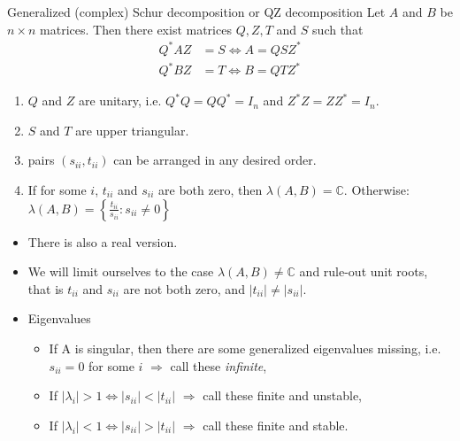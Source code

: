 \documentclass[10pt]{beamer}  %
\begin{document}
\begin{frame}[shrink]\scriptsize
\frametitle{\secname}\framesubtitle{}
\begin{block}{Generalized (complex) Schur decomposition or QZ decomposition}
Let $A$ and $B$ be $n\times n$ matrices. Then there exist matrices $Q,Z,T$ and $S$ such that
\begin{align*}
  Q^* A Z &= S \Leftrightarrow A = Q S Z^*\\
  Q^* B Z &= T \Leftrightarrow B = Q T Z^*
\end{align*}
\begin{enumerate}
  \item $Q$ and $Z$ are unitary, i.e. $Q^*Q=QQ^*=I_n$ and $Z^*Z=ZZ^*=I_n$.
  \item $S$ and $T$ are upper triangular.
 \item pairs $(s_{ii},t_{ii})$ can be arranged in any desired order.
  \item If for some $i$, $t_{ii}$ and $s_{ii}$ are both zero, then $\lambda(A,B)=\mathbb{C}$. Otherwise:
$\lambda(A,B) = \left\{\frac{t_{ii}}{s_{ii}}:s_{ii} \neq 0 \right\}$
\end{enumerate}
\end{block}
\begin{itemize}\scriptsize
  \item There is also a real version.
  \item We will limit ourselves to the case $\lambda(A,B)\neq \mathbb{C}$ and rule-out unit roots, that is $t_{ii}$ and $s_{ii}$ are not both zero, and $|t_{ii}|\neq |s_{ii}|$.
  \item Eigenvalues
  \begin{itemize}\scriptsize
  \item If A is singular, then there are some generalized eigenvalues missing, i.e. $s_{ii}=0$ for some $i$ $\Rightarrow$ call these \emph{infinite},
  \item If $|\lambda_i|>1 \Leftrightarrow |s_{ii}|<|t_{ii}|$ $\Rightarrow$ call these finite and unstable,
  \item If $|\lambda_i|<1 \Leftrightarrow |s_{ii}|>|t_{ii}|$ $\Rightarrow$ call these finite and stable.
  \end{itemize}
\end{itemize}
\end{frame}
\end{document}
